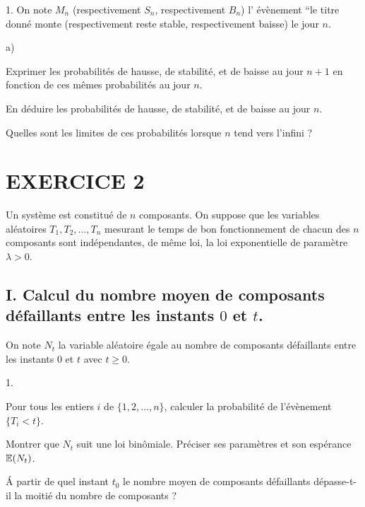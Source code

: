 \documentclass[11pt]{article}%
\begin{document}
\begin{noliste}{1.}
\noindent On note $M_{n}$ (respectivement $S_{n}$, respectivement
$B_{n}$) l'
évènement \textquotedblleft le titre donné monte (respectivement reste
stable, respectivement baisse) le jour $n$.

\begin{noliste}{a)}
 \setlength{\itemsep}{2mm}
\item Exprimer les probabilités de hausse, de stabilité, et de baisse
au
jour $n + 1$ en fonction de ces mêmes probabilités au jour $n$.

\item En déduire les probabilités de hausse, de stabilité, et de baisse
au
jour $n$.

\item Quelles sont les limites de ces probabilités lorsque $n$ tend
vers
l'infini ?
\end{noliste}
\end{noliste}

\section*{EXERCICE 2}

Un système est constitué de $n$ composants. On suppose que les
variables aléatoires $T_{1},T_{2},\ldots,T_{n}$ mesurant le temps de
bon fonctionnement de chacun des $n$ composants sont indépendantes, de
même loi, la loi exponentielle de paramètre $\lambda >0$.

\subsection*{I. Calcul du nombre moyen de composants défaillants entre
les
instants $0$ et $t$.}

On note $N_{t}$ la variable aléatoire égale au nombre de composants
défaillants entre les instants $0$ et $t$ avec $t\geq 0$.

\begin{noliste}{1.}
 \setlength{\itemsep}{4mm}
\item Pour tous les entiers $i$ de $\{1,2,\ldots,n\}$, calculer la
probabilité de l'évènement $\{T_{i}<t\}$.

\item Montrer que $N_{t}$ suit une loi binômiale. Préciser ses
paramètres et
son espérance $\mathbb{E}(N_{t})$.

\item \'A partir de quel instant $t_{0}$ le nombre moyen de composants
défaillants dépasse-t-il la moitié du nombre de composants ?
\end{noliste}
\end{document}
